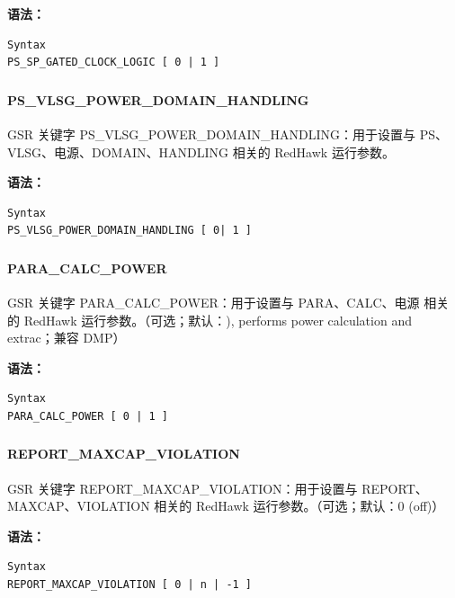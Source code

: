 \textbf{语法：}
\begin{lstlisting}
Syntax
PS_SP_GATED_CLOCK_LOGIC [ 0 | 1 ]
\end{lstlisting}

\subsubsection{}
\paragraph*{PS_VLSG_POWER_DOMAIN_HANDLING}

GSR 关键字 PS_VLSG_POWER_DOMAIN_HANDLING：用于设置与 PS、VLSG、电源、DOMAIN、HANDLING 相关的 RedHawk 运行参数。

\textbf{语法：}
\begin{lstlisting}
Syntax
PS_VLSG_POWER_DOMAIN_HANDLING [ 0| 1 ]
\end{lstlisting}

\subsubsection{}
\paragraph*{PARA_CALC_POWER}

GSR 关键字 PARA_CALC_POWER：用于设置与 PARA、CALC、电源 相关的 RedHawk 运行参数。（可选；默认：), performs power calculation and extrac；兼容 DMP）

\textbf{语法：}
\begin{lstlisting}
Syntax
PARA_CALC_POWER [ 0 | 1 ]
\end{lstlisting}

\subsubsection{}
\paragraph*{REPORT_MAXCAP_VIOLATION}

GSR 关键字 REPORT_MAXCAP_VIOLATION：用于设置与 REPORT、MAXCAP、VIOLATION 相关的 RedHawk 运行参数。（可选；默认：0 (off)）

\textbf{语法：}
\begin{lstlisting}
Syntax
REPORT_MAXCAP_VIOLATION [ 0 | n | -1 ]
\end{lstlisting}

